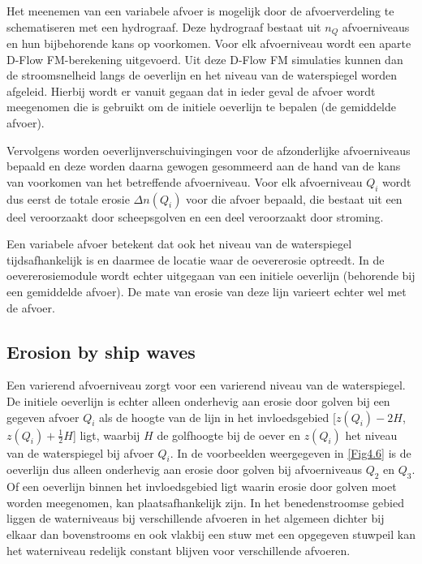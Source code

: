Het meenemen van een variabele afvoer is mogelijk door de afvoerverdeling te schematiseren met een hydrograaf.
Deze hydrograaf bestaat uit $n_Q$ afvoerniveaus en hun bijbehorende kans op voorkomen.
Voor elk afvoerniveau wordt een aparte D-Flow FM-berekening uitgevoerd.
Uit deze D-Flow FM simulaties kunnen dan de stroomsnelheid langs de oeverlijn en het niveau van de waterspiegel worden afgeleid.
Hierbij wordt er vanuit gegaan dat in ieder geval de afvoer wordt meegenomen die is gebruikt om de initiele oeverlijn te bepalen (de gemiddelde afvoer).

Vervolgens worden oeverlijnverschuivingingen voor de afzonderlijke afvoerniveaus bepaald en deze worden daarna gewogen gesommeerd aan de hand van de kans van voorkomen van het betreffende afvoerniveau.
Voor elk afvoerniveau $Q_i$ wordt dus eerst de totale erosie $\Delta n ( Q_i )$ voor die afvoer bepaald, die bestaat uit een deel veroorzaakt door scheepsgolven en een deel veroorzaakt door stroming.

Een variabele afvoer betekent dat ook het niveau van de waterspiegel tijdsafhankelijk is en daarmee de locatie waar de oevererosie optreedt.
In de oevererosiemodule wordt echter uitgegaan van een initiele oeverlijn (behorende bij een gemiddelde afvoer).
De mate van erosie van deze lijn varieert echter wel met de afvoer.


\subsection{Erosion by ship waves}

Een varierend afvoerniveau zorgt voor een varierend niveau van de waterspiegel.
De initiele oeverlijn is echter alleen onderhevig aan erosie door golven bij een gegeven afvoer $Q_i$ als de hoogte van de lijn in het invloedsgebied [$z(Q_i) - 2 H$, $z(Q_i) + \frac{1}{2} H$] ligt, waarbij $H$ de golfhoogte bij de oever en $z(Q_i)$ het niveau van de waterspiegel bij afvoer $Q_i$.
In de voorbeelden weergegeven in \autoref{Fig4.6} is de oeverlijn dus alleen onderhevig aan erosie door golven bij afvoerniveaus $Q_2$ en $Q_3$.
Of een oeverlijn binnen het invloedsgebied ligt waarin erosie door golven moet worden meegenomen, kan plaatsafhankelijk zijn.
In het benedenstroomse gebied liggen de waterniveaus bij verschillende afvoeren in het algemeen dichter bij elkaar dan bovenstrooms en ook vlakbij een stuw met een opgegeven stuwpeil kan het waterniveau redelijk constant blijven voor verschillende afvoeren.

